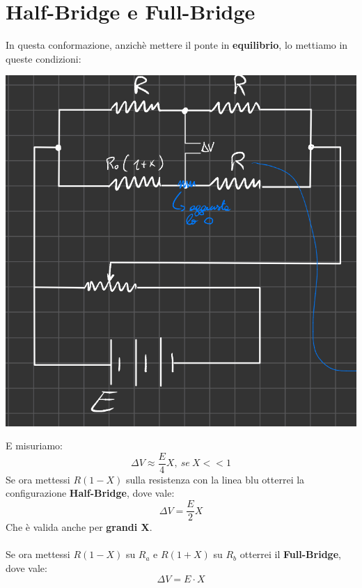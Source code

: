 \section{Half-Bridge e Full-Bridge}
In questa conformazione, anzichè mettere il ponte in \textbf{equilibrio}, lo mettiamo in queste condizioni:
\begin{center}
    \includegraphics[width=.6\textwidth]{Images/figure6.png}
\end{center}
E misuriamo:
\begin{equation*}
    \Delta V \approx \frac{E}{4} X, \ se \ X << 1
\end{equation*}
Se ora mettessi $R(1-X)$ sulla resistenza con la linea blu otterrei la configurazione \textbf{Half-Bridge}, dove vale:
\begin{equation*}
    \Delta V = \frac{E}{2}X 
\end{equation*}
Che è valida anche per \textbf{grandi X}.\\ \\
Se ora mettessi $R(1 - X)$ su $R_a$ e $R( 1 + X )$ su $R_b$ otterrei il \textbf{Full-Bridge}, dove vale:
\begin{equation*}
    \Delta V = E \cdot X
\end{equation*}
